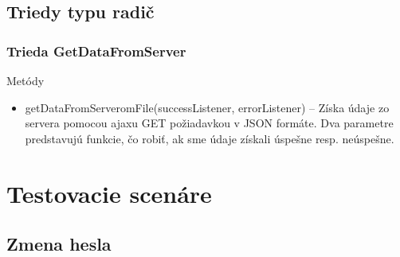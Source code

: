 \documentclass[12pt,a4paper]{report}
\begin{document}
\section[Triedy typu radič]{\rmfamily\bfseries
	Triedy typu radič}

\subsection[Trieda GetDataFromServer]{\rmfamily\bfseries
	Trieda GetDataFromServer}
Metódy
\begin{itemize}
	\item getDataFromServeromFile(successListener, errorListener) – Získa údaje zo servera pomocou ajaxu GET požiadavkou v JSON formáte. Dva parametre predstavujú funkcie, čo robiť, ak sme údaje získali úspešne resp. neúspešne.
\end{itemize}

\chapter[Testovacie scenáre]{\rmfamily\bfseries
	Testovacie scenáre}

\section[Zmena hesla alebo údajov]{\rmfamily\bfseries
	Zmena hesla}
\end{document}
